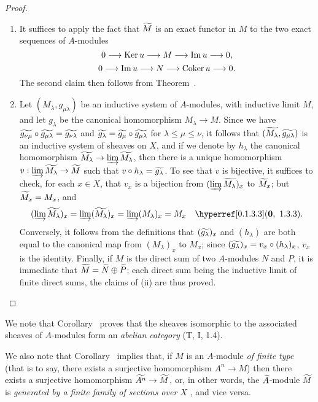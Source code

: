 \begin{proof}
\label{proof-1.1.3.9}
\medskip\noindent
\begin{enumerate}[label=(\roman*)]
  \item It suffices to apply the fact that ${\widetilde{M}}$ is an exact functor in $M$  to the two exact sequences of $A$-modules
    \[
      0\to\Ker u\to M\to\Im u\to 0,
    \]
    \[
      0\to\Im u\to N\to\Coker u\to 0.
    \]
    The second claim then follows from Theorem~.
  \item Let $(M_\lambda,g_{\mu\lambda})$ be an inductive system of $A$-modules, with inductive limit $M$, and let $g_\lambda$ be the canonical homomorphism $M_\lambda\to M$.
    Since we have ${\widetilde{g_{\nu\mu}}}\circ{\widetilde{g_{\mu\lambda}}}={\widetilde{g_{\nu\lambda}}}$ and ${\widetilde{g_\lambda}}={\widetilde{g_\mu}}\circ{\widetilde{g_{\mu\lambda}}}$ for $\lambda\leqslant\mu\leqslant\nu$, it follows that $({\widetilde{M_\lambda}},{\widetilde{g_{\mu\lambda}}})$ is an inductive system of sheaves on $X$, and if we denote by $h_\lambda$ the canonical homomorphism $\wt{M_\lambda}\to\varinjlim\wt{M_\lambda}$, then there is a unique homomorphism $v:\varinjlim\wt{M_\lambda}\to\wt{M}$ such that $v\circ h_\lambda={\widetilde{g_\lambda}}$.
    To see that $v$ is bijective, it suffices to check, for each $x\in X$, that $v_x$ is a bijection from $(\varinjlim{\widetilde{M_\lambda}})_x$ to ${\widetilde{M}}_x$;
    but ${\widetilde{M}}_x=M_x$, and
    \[
      (\varinjlim\wt{M_\lambda})_x=\varinjlim(\wt{M_\lambda})_x
      =\varinjlim(M_\lambda)_x=M_x\quad\sref[0]{0.1.3.3}.
    \]
    Conversely, it follows from the definitions that $({\widetilde{g_\lambda}})_x$ and
    $(h_\lambda)$ are both equal to the canonical map from $(M_\lambda)_x$ to $M_x$;
    since $({\widetilde{g_\lambda}})_x=v_x\circ(h_\lambda)_x$, $v_x$ is the identity.
    Finally, if $M$ is the direct sum of two $A$-modules $N$ and $P$, it is immediate that ${\widetilde{M}}={\widetilde{N}}\oplus{\widetilde{P}}$;
    each direct sum being the inductive limit of finite direct sums, the claims of (ii) are thus proved.
\end{enumerate}
\end{proof}

We note that Corollary~ proves that the sheaves isomorphic to the associated sheaves of $A$-modules form an \emph{abelian category} (T, I, 1.4).

We also note that Corollary~ implies that, if $M$ is an $A$-module \emph{of finite type} (that is to say, there exists a surjective homomorphism $A^n\to M$) then there exists a surjective homomorphism $\wt{A^n}\to\wt{M}$, or, in other words, the ${\widetilde{A}}$-module ${\widetilde{M}}$ is \emph{generated by a finite family of sections over $X$} , and vice versa.

